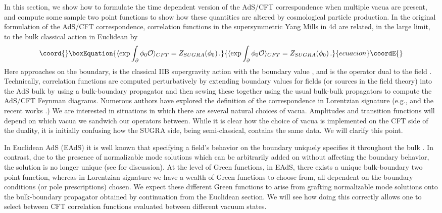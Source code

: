 \documentclass[a4paper,aps,prd,preprintnumbers,groupedaddress]{revtex4}
\begin{document}
In this section, we show how to formulate the time dependent version of the AdS/CFT correspondence  when multiple vacua are present, and compute some sample two
point functions to show how these quantities are altered by cosmological particle production.  In the original formulation of the
AdS/CFT correspondence, correlation functions in the \coordHE{} supersymmetric \coordHE{} Yang Mills in 4d are related, in the large \coordHE{} limit, to the bulk classical action in Euclidean \coordHE{} \cite{maldacena97,witten98,gubser98} by
\begin{equation}\coord{}\boxEquation{
\label{euclidean ads/cft} \langle \exp \int _{\partial} \phi_0 {\cal O} \rangle_{CFT} = Z_{SUGRA} (\phi_0) \, .
}{
\langle \exp \int _{\partial} \phi_0 {\cal O} \rangle_{CFT} = Z_{SUGRA} (\phi_0) \, .
}{ecuacion}\coordE{}\end{equation}
Here \myHighlight{$\phi$}\coordHE{} approaches \coordHE{} on the boundary, \coordHE{} is the classical IIB supergravity action with the
boundary value \coordHE{}, and \coordHE{} is the operator dual to the field \myHighlight{$\phi$}\coordHE{}.  Technically, correlation functions
are computed perturbatively by extending boundary values for fields (or sources in the field theory) into the AdS bulk by using a bulk-boundary propagator and then sewing these together using the usual bulk-bulk propagators to compute the AdS/CFT Feynman diagrams.  Numerous authors have explored the definition of the correspondence in Lorentzian signature (e.g., \cite{vijay981,vijay982,banks98,vijay99,giddings99,danielsson,esko} and the recent works
 \cite{son02,herzog02,troost02,kraus02}.)  We are interested in situations in which there are several natural choices of vacua.   Amplitudes and transition functions will depend on  which vacua we sandwich our operators between.   While it is clear how the choice of vacua is implemented on the CFT side of the duality, it is initially confusing how the SUGRA side, being semi-classical, contains the same data.  We will clarify this point.

In Euclidean AdS (EAdS) it is well known that specifying a field's behavior on the boundary uniquely specifies it throughout the bulk
\cite{witten98}. In contrast, due to the presence of normalizable mode solutions which can be arbitrarily added on without affecting the
boundary behavior, the solution is no longer unique (see \cite{vijay981,vijay982} for discussion).     At the level of Green
functions, in EAdS, there exists a unique bulk-boundary two point function, whereas in Lorentzian signature we have a wealth of Green
functions to choose from, all dependent on the boundary conditions (or pole prescriptions) chosen.
We expect these different Green functions to arise from grafting normalizable mode solutions onto the bulk-boundary propagator obtained by continuation from the Euclidean section.  We will see how doing this correctly allows one to select between CFT correlation functions evaluated between different vacuum states.
\end{document}

